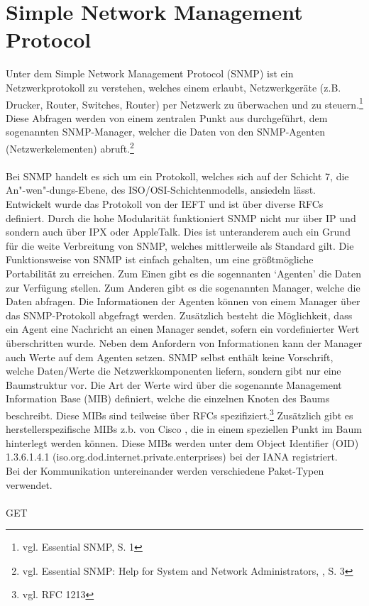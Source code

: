 \section{Simple Network Management Protocol}
\label{sec:snmp}
Unter dem Simple Network Management Protocol (SNMP) ist ein Netzwerkprotokoll zu verstehen, welches einem erlaubt, Netzwerkgeräte (z.B. Drucker, Router, Switches, Router) per Netzwerk zu überwachen und zu steuern.\footnote{vgl. Essential SNMP, S. 1}
Diese Abfragen werden von einem zentralen Punkt aus durchgeführt, dem sogenannten SNMP-Manager, welcher die Daten von den SNMP-Agenten (Netzwerkelementen) abruft.\footnote{vgl. Essential SNMP: Help for System and Network Administrators, , S. 3}\\\\
Bei SNMP handelt es sich um ein Protokoll, welches sich auf der Schicht 7, die An"-wen"-dungs-Ebene, des ISO/OSI-Schichtenmodells, ansiedeln lässt.
Entwickelt wurde das Protokoll von der IEFT und ist über diverse RFCs definiert.
Durch die hohe Modularität funktioniert SNMP nicht nur über IP und sondern auch über IPX oder AppleTalk.
Dies ist unteranderem auch ein Grund für die weite Verbreitung von SNMP, welches mittlerweile als Standard gilt.
Die Funktionsweise von SNMP ist einfach gehalten, um eine größtmögliche Portabilität zu erreichen.
Zum Einen gibt es die sogennanten ‘Agenten’ die Daten zur Verfügung stellen. Zum Anderen gibt es die sogenannten Manager, welche die Daten abfragen.
Die Informationen der Agenten können von einem Manager über das SNMP-Protokoll abgefragt werden.
Zusätzlich besteht die Möglichkeit, dass ein Agent eine Nachricht an einen Manager sendet, sofern ein vordefinierter Wert überschritten wurde.
Neben dem Anfordern von Informationen kann der Manager auch Werte auf dem Agenten setzen.
SNMP selbst enthält keine Vorschrift, welche Daten/Werte die Netzwerkkomponenten liefern, sondern gibt nur eine Baumstruktur vor.
Die Art der Werte wird über die sogenannte Management Information Base (MIB) definiert, welche die einzelnen Knoten des Baums beschreibt.
Diese MIBs sind teilweise über RFCs spezifiziert.\footnote{vgl. RFC 1213}
Zusätzlich gibt es herstellerspezifische MIBs z.b. von Cisco , die in einem speziellen Punkt im Baum hinterlegt werden können. Diese MIBs werden unter dem  Object Identifier (OID) 1.3.6.1.4.1 (iso.org.dod.internet.private.enterprises) bei der IANA registriert.\\
Bei der Kommunikation untereinander werden verschiedene Paket-Typen verwendet.\\
\\
GET\\

